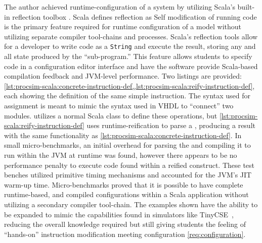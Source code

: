 The author achieved runtime-configuration of a system by utilizing Scala's built-in reflection toolbox \cite{Scala-Reflection}. Scala defines reflection as  Self modification of running code is the primary feature required for runtime configuration of a model without utilizing separate compiler tool-chains and processes. Scala's reflection tools allow for a developer to write code as a \texttt{String} and execute the result, storing any and all state produced by the ``sub-program.'' This feature allows students to specify code in a configuration editor interface and have the software provide Scala-based compilation feedback and JVM-level performance. Two listings are provided: \cref{lst:procsim-scala:concrete-instruction-def,,lst:procsim-scala:reify-instruction-def}, each showing the definition of the same simple instruction. The syntax used for assignment is meant to mimic the syntax used in VHDL to ``connect'' two modules.  utilizes a normal Scala class to define these operations, but \cref{lst:procsim-scala:reify-instruction-def} uses runtime-reification to parse a , producing a result with the same functionality as \cref{lst:procsim-scala:concrete-instruction-def}. In small micro-benchmarks, an initial overhead for parsing the  and compiling it to run within the JVM at runtime was found, however there appears to be no performance penalty to execute code found within a reified construct. These test benches utilized primitive timing mechanisms and accounted for the JVM's JIT warm-up time. Micro-benchmarks proved that it is possible to have complete runtime-based, and compiled configurations within a Scala application without utilizing a secondary compiler tool-chain. The examples shown have the ability to be expanded to mimic the capabilities found in simulators like TinyCSE~\cite{Nakamura2013, McLoughlin2010}, reducing the overall knowledge required but still giving students the feeling of ``hands-on'' instruction modification meeting configuration \cref{req:configuration}.


